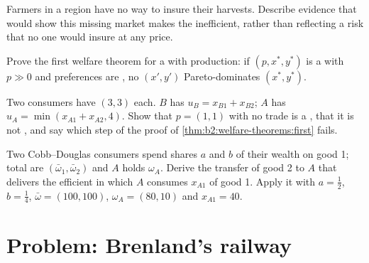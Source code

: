 \begin{exercise}[$\star\star$]\label{exo:b2:welfare-theorems:9}
Farmers in a region have no way to insure their harvests. Describe evidence that would show this missing
market makes the  inefficient, rather than reflecting a risk that no one would insure at any
price.
\end{exercise}

\begin{exercise}[$\star\star\star$]\label{exo:b2:welfare-theorems:10}
Prove the first welfare theorem for a  with production: if $(p, x^*, y^*)$ is a
 with $p \gg 0$ and preferences are , no 
$(x', y')$ Pareto-dominates $(x^*, y^*)$.
\end{exercise}

\begin{exercise}[$\star\star\star$]\label{exo:b2:welfare-theorems:11}
Two consumers have  $(3, 3)$ each. $B$ has $u_B = x_{B1} + x_{B2}$; $A$ has $u_A = \min(x_{A1} +
x_{A2}, 4)$. Show that $p = (1, 1)$ with no trade is a , that it is not
, and say which step of the proof of \cref{thm:b2:welfare-theorems:first} fails.
\end{exercise}

\begin{exercise}[$\star\star\star$]\label{exo:b2:welfare-theorems:12}
Two Cobb--Douglas consumers spend shares $a$ and $b$ of their wealth on good 1; total  are
$(\bar\omega_1, \bar\omega_2)$ and $A$ holds $\omega_A$. Derive the transfer of good 2 to $A$ that
delivers the efficient  in which $A$ consumes $x_{A1}$ of good 1. Apply it with $a = \tfrac12$,
$b = \tfrac14$, $\bar\omega = (100, 100)$, $\omega_A = (80, 10)$ and $x_{A1} = 40$.
\end{exercise}

\section{Problem: Brenland's railway}\label{sec:b2:welfare-theorems:problem}

